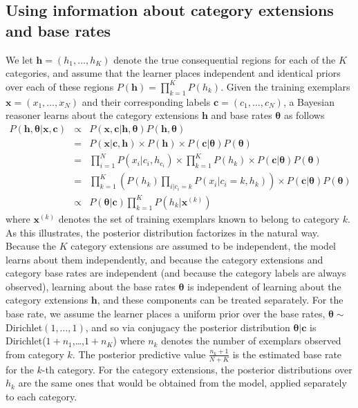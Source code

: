 \documentclass[doc,apacite]{apa6}
\begin{document}
\subsection*{Using information about category extensions and base rates}

We let $\bm{h}=(h_1,\ldots,h_K)$ denote the true consequential regions for each of the $K$ categories, and assume that the learner places independent and identical priors over each of these regions $P(\bm{h})=\prod_{k=1}^K P(h_k)$. Given the training exemplars $\bm{x}=(x_1,\ldots,x_N)$ and their corresponding labels $\bm{c}=(c_1,\ldots,c_N)$, a Bayesian reasoner learns about the category extensions $\bm{h}$ and base rates $\bm{\theta}$ as follows
\begin{eqnarray*}
P(\bm{h},\bm{\theta} | \bm{x}, \bm{c}) 
&\propto& P(\bm{x}, \bm{c} | \bm{h},\bm{\theta}) P(\bm{h},\bm{\theta}) \\
&=& P(\bm{x} | \bm{c}, \bm{h})  \times P(\bm{h}) \times  P(\bm{c} | \bm{\theta}) P(\bm{\theta}) \\
&=&  \prod_{i=1}^N P(x_i | c_i, h_{c_i})  \times \prod_{k=1}^K P(h_k)  \times P(\bm{c} | \bm{\theta}) P(\bm{\theta}) \\
&=&   \prod_{k=1}^K \left( P(h_k) \prod_{i|c_i=k} P(x_i | c_i=k, h_k) \right)  \times  P(\bm{c} | \bm{\theta}) P(\bm{\theta}) \\
& \propto & P(\bm\theta | \bm{c}) \prod_{k=1}^K P(h_k | \bm{x}^{(k)})  
\end{eqnarray*}
where $\bm{x}^{(k)}$ denotes the set of training exemplars known to belong to category $k$. As this illustrates, the posterior distribution factorizes in the natural way. Because the $K$ category extensions are assumed to be independent, the model learns about them independently, and because the category extensions and category base rates are independent (and because the category labels are always observed), learning about the base rates $\bm{\theta}$ is independent of learning about the category extensions $\bm{h}$, and these components can be treated separately. For the base rate, we assume the learner places a uniform prior over the base rates, $\bm{\theta}\sim$Dirichlet$(1,\ldots,1)$, and so via conjugacy the posterior distribution $\bm{\theta}|\bm{c}$ is Dirichlet($1+n_1$,\ldots,$1+n_K$) where $n_k$ denotes the number of exemplars observed from category $k$. The posterior predictive value $\frac{n_k + 1}{N + K}$ is the estimated base rate for the $k$-th category. For the category extensions, the posterior distributions over $h_k$ are the same ones that would be obtained from the  model, applied separately to each category.
\end{document}
